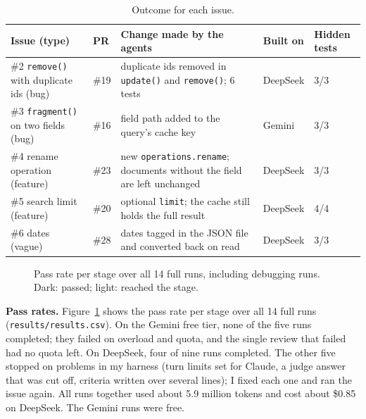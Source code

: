 \documentclass[10pt,a4paper]{article}
\newcommand{\code}[1]{\texttt{#1}}
\begin{document}
\begin{table}[h]
\centering\footnotesize
\caption{Outcome for each issue.}
\label{tab:results}
\begin{tabularx}{\textwidth}{@{}l l L l l@{}}
\toprule
Issue (type) & PR & Change made by the agents & Built on & Hidden tests \\
\midrule
\#2 \code{remove()} with duplicate ids (bug) & \#19 & duplicate ids removed in \code{update()} and \code{remove()}; 6 tests & DeepSeek & 3/3 \\
\#3 \code{fragment()} on two fields (bug) & \#16 & field path added to the query's cache key & Gemini & 3/3 \\
\#4 rename operation (feature) & \#23 & new \code{operations.rename}; documents without the field are left unchanged & DeepSeek & 3/3 \\
\#5 search limit (feature) & \#20 & optional \code{limit}; the cache still holds the full result & DeepSeek & 4/4 \\
\#6 dates (vague) & \#28 & dates tagged in the JSON file and converted back on read & DeepSeek & 3/3 \\
\bottomrule
\end{tabularx}
\end{table}

\begin{figure}[h]
\centering
{}
\caption{Pass rate per stage over all 14 full runs, including debugging runs. Dark: passed; light:
reached the stage.}
\label{fig:passrate}
\end{figure}

\textbf{Pass rates.} Figure~\ref{fig:passrate} shows the pass rate per stage over all 14 full runs
(\code{results/results.csv}). On the Gemini free tier, none of the five runs completed; they failed on
overload and quota, and the single review that failed had no quota left. On DeepSeek, four of nine runs
completed. The other five stopped on problems in my harness (turn limits set for Claude, a judge answer that
was cut off, criteria written over several lines); I fixed each one and ran the issue again. All runs
together used about 5.9 million tokens and cost about \$0.85 on DeepSeek. The Gemini runs were free.
\end{document}

